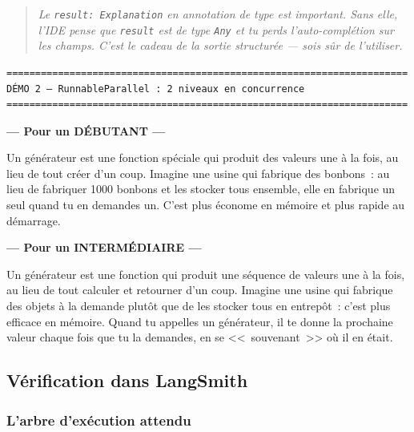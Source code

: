 \documentclass[11pt,a4paper]{article}
\begin{document}
\begin{quote}\itshape
Le \texttt{result: Explanation} en annotation de type est important. Sans
elle, l'IDE pense que \texttt{result} est de type \texttt{Any} et tu perds
l'auto-complétion sur les champs. C'est le \emph{cadeau} de la sortie
structurée — sois sûr de l'utiliser.
\end{quote}

\begin{tcolorbox}[
  colback=white,
  colframe=black!50,
  coltitle=black,
  fonttitle=\footnotesize\bfseries,
  fontupper=\footnotesize,
  title=Sortie de l'exécution,
  breakable,
]
\begin{verbatim}
======================================================================
DÉMO 2 — RunnableParallel : 2 niveaux en concurrence
======================================================================
\end{verbatim}

\textbf{--- Pour un DÉBUTANT ---}

Un générateur est une fonction spéciale qui produit des valeurs une à la
fois, au lieu de tout créer d'un coup. Imagine une usine qui fabrique des
bonbons~: au lieu de fabriquer 1000 bonbons et les stocker tous ensemble,
elle en fabrique un seul quand tu en demandes un. C'est plus économe en
mémoire et plus rapide au démarrage.

\textbf{--- Pour un INTERMÉDIAIRE ---}

Un générateur est une fonction qui produit une séquence de valeurs une à la
fois, au lieu de tout calculer et retourner d'un coup. Imagine une usine qui
fabrique des objets à la demande plutôt que de les stocker tous en
entrepôt~: c'est plus efficace en mémoire. Quand tu appelles un générateur,
il te donne la prochaine valeur chaque fois que tu la demandes, en se
<<~souvenant~>> où il en était.
\end{tcolorbox}

\subsection{Vérification dans LangSmith}

\subsubsection*{L'arbre d'exécution attendu}

\begin{center}
\end{center}
\end{document}
